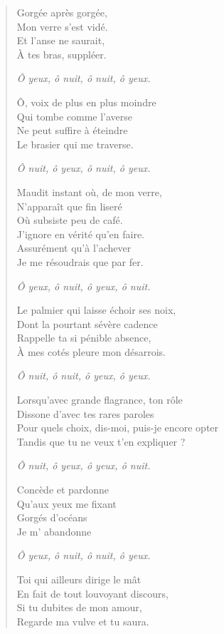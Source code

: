 \begin{verse}
Gorgée après gorgée,\\
Mon verre s’est vidé.\\
Et l’anse ne saurait,\\
À tes bras, suppléer.

\emph{Ô yeux, ô nuit, ô nuit, ô yeux.}

Ô, voix de plus en plus moindre\\
Qui tombe comme l’averse\\
Ne peut suffire à éteindre\\
Le brasier qui me traverse.

\emph{Ô nuit, ô yeux, ô nuit, ô yeux.}

Maudit instant où, de mon verre,\\
N’apparaît que fin liseré\\
Où subsiste peu de café.\\
J’ignore en vérité qu’en faire.\\
Assurément qu’à l’achever\\
Je me résoudrais que par fer.

\emph{Ô yeux, ô nuit, ô yeux, ô nuit.}

Le palmier qui laisse échoir ses noix,\\
Dont la pourtant sévère  cadence\\
Rappelle ta si pénible absence,\\
À mes cotés pleure mon désarrois.

\emph{Ô nuit, ô nuit, ô yeux, ô yeux.}

Lorsqu’avec grande flagrance, ton rôle\\
Dissone d’avec tes rares paroles\\
Pour quels choix, dis-moi, puis-je encore opter\\
Tandis que tu ne veux t’en expliquer ?

\emph{Ô nuit, ô yeux, ô yeux, ô nuit.}

Concède et pardonne\\
Qu’aux yeux me fixant\\
Gorgés d’océans\\
Je m’ abandonne

\emph{Ô yeux, ô nuit, ô nuit, ô yeux.}

Toi qui ailleurs dirige le mât\\
En fait de tout louvoyant discours,\\
Si tu dubites de mon amour,\\
Regarde ma vulve et tu saura.
\end{verse}

